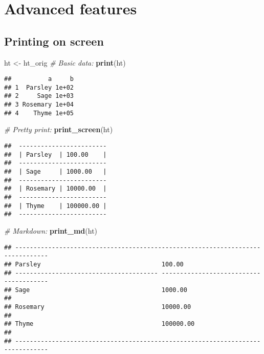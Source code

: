 \documentclass[]{article}
\newenvironment{Shaded}{\begin{snugshade}}{\end{snugshade}}
\newcommand{\KeywordTok}[1]{\textcolor[rgb]{0.13,0.29,0.53}{\textbf{{#1}}}}
\newcommand{\StringTok}[1]{\textcolor[rgb]{0.31,0.60,0.02}{{#1}}}
\newcommand{\CommentTok}[1]{\textcolor[rgb]{0.56,0.35,0.01}{\textit{{#1}}}}
\newcommand{\NormalTok}[1]{{#1}}
\begin{document}
\FloatBarrier

\section{Advanced features}\label{advanced-features}

\subsection{Printing on screen}\label{printing-on-screen}

\begin{Shaded}
\begin{Highlighting}[]
\NormalTok{ht <-}\StringTok{ }\NormalTok{ht_orig}
\CommentTok{# Basic data:}
\KeywordTok{print}\NormalTok{(ht)}
\end{Highlighting}
\end{Shaded}

\begin{verbatim}
##          a     b
## 1  Parsley 1e+02
## 2     Sage 1e+03
## 3 Rosemary 1e+04
## 4    Thyme 1e+05
\end{verbatim}

\begin{Shaded}
\begin{Highlighting}[]
\CommentTok{# Pretty print:}
\KeywordTok{print_screen}\NormalTok{(ht)}
\end{Highlighting}
\end{Shaded}

\begin{verbatim}
##  ------------------------ 
##  | Parsley  | 100.00    | 
##  ------------------------ 
##  | Sage     | 1000.00   | 
##  ------------------------ 
##  | Rosemary | 10000.00  | 
##  ------------------------ 
##  | Thyme    | 100000.00 | 
##  ------------------------
\end{verbatim}

\begin{Shaded}
\begin{Highlighting}[]
\CommentTok{# Markdown:}
\KeywordTok{print_md}\NormalTok{(ht)}
\end{Highlighting}
\end{Shaded}

\begin{verbatim}
## -------------------------------------------------------------------------------
## Parsley                                 100.00                                  
## --------------------------------------- ---------------------------------------
## Sage                                    1000.00                                 
## 
## Rosemary                                10000.00                                
## 
## Thyme                                   100000.00                               
## 
## -------------------------------------------------------------------------------
\end{verbatim}
\end{document}
